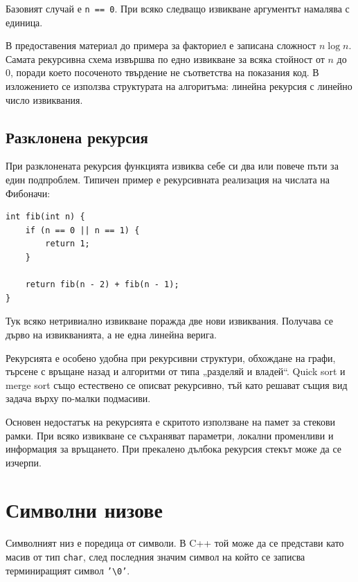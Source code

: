 Базовият случай е \texttt{n == 0}. При всяко следващо извикване аргументът намалява с единица.

\begin{supp}[Бележка]
В предоставения материал до примера за факториел е записана сложност $n\log n$. Самата рекурсивна схема извършва по едно извикване за всяка стойност от $n$ до $0$, поради което посоченото твърдение не съответства на показания код. В изложението се използва структурата на алгоритъма: линейна рекурсия с линейно число извиквания.
\end{supp}

\subsection{Разклонена рекурсия}\label{s:15.6.2}

При разклонената рекурсия функцията извиква себе си два или повече пъти за един подпроблем. Типичен пример е рекурсивната реализация на числата на Фибоначи:

\begin{verbatim}
int fib(int n) {
    if (n == 0 || n == 1) {
        return 1;
    }

    return fib(n - 2) + fib(n - 1);
}
\end{verbatim}

Тук всяко нетривиално извикване поражда две нови извиквания. Получава се дърво на извикванията, а не една линейна верига.

Рекурсията е особено удобна при рекурсивни структури, обхождане на графи, търсене с връщане назад и алгоритми от типа „разделяй и владей“. Quick sort и merge sort също естествено се описват рекурсивно, тъй като решават същия вид задача върху по-малки подмасиви.

Основен недостатък на рекурсията е скритото използване на памет за стекови рамки. При всяко извикване се съхраняват параметри, локални променливи и информация за връщането. При прекалено дълбока рекурсия стекът може да се изчерпи.

\section{Символни низове}\label{s:15.7}

\begin{defn}
Символният низ е поредица от символи. В C++ той може да се представи като масив от тип \texttt{char}, след последния значим символ на който се записва терминиращият символ \texttt{'\textbackslash 0'}.
\end{defn}

